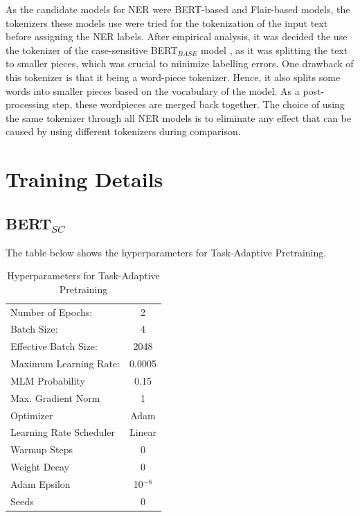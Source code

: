 \documentclass{report}
\theoremstyle{definition}
\theoremstyle{remark}
\begin{document}
    As the candidate models for NER were BERT-based \cite{BERT} and Flair-based \cite{flairpaper} models, the tokenizers these models use were tried for the tokenization of the input text before assigning the NER labels. After empirical analysis, it was decided the use the tokenizer of the case-sensitive BERT$_{BASE}$ model \cite{BERT}, as it was splitting the text to smaller pieces, which was crucial to minimize labelling errors. One drawback of this tokenizer is that it being a word-piece tokenizer. Hence, it also splits some words into smaller pieces based on the vocabulary of the model. As a post-processing step, these wordpieces are merged back together. The choice of using the same tokenizer through all NER models is to eliminate any effect that can be caused by using different tokenizers during comparison.

\newpage
\chapter{Training Details}
\section{BERT$_{SC}$}
\label{sec:app:bertsc}
The table below shows the hyperparameters for Task-Adaptive Pretraining.
\begin{table}[h!]
    \centering
    \begin{tabular}{|lc|}
    \hline
     Number of Epochs: & 2  \\
     Batch Size: & 4\\
     Effective Batch Size: & 2048 \\
     Maximum Learning Rate: & 0.0005 \\
     MLM Probability & 0.15 \\
     Max. Gradient Norm & 1 \\
     Optimizer & Adam \cite{adamopt} \\
     Learning Rate Scheduler & Linear \\
     Warmup Steps & 0 \\
     Weight Decay & 0 \\
     Adam Epsilon & 10$^{-8}$ \\
     Seeds & 0 \\

     \hline
    \end{tabular}
    \caption{Hyperparameters for Task-Adaptive Pretraining}
    \label{tab:pretrainhyper}
\end{table}
\newpage
\end{document}
